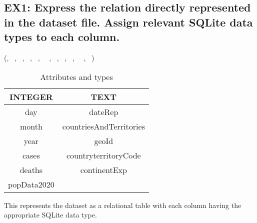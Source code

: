 \documentclass{article}
\begin{document}
\subsection*{EX1: Express the relation directly represented in the dataset file. Assign relevant SQLite data types to each column.}
(, \ , \ , \ , \ , \ \ , \ , \ , \ , \ \ , \  )

\begin{center}
\begin{table}[H]
\centering
\footnotesize
\begin{tabular}{|c|c|}
\hline
\textbf{INTEGER} & \textbf{TEXT} \\
\hline
 day & dateRep\\
 month& countriesAndTerritories  \\
year & geoId  \\
cases& countryterritoryCode \\
deaths& continentExp \\
popData2020& \\
\hline
\end{tabular}
\caption{Attributes and types}
\label{tab:covid-data}
\end{table}
\end{center}
This represents the dataset as a relational table with each column having the appropriate SQLite data type.
\end{document}
